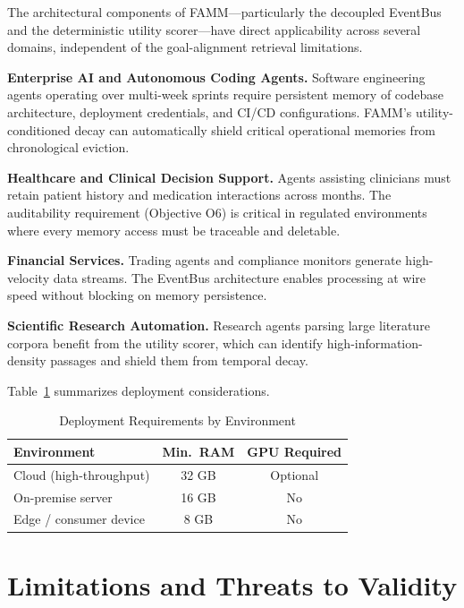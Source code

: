 \documentclass[conference]{IEEEtran}
\begin{document}
The architectural components of FAMM---particularly the decoupled EventBus and the deterministic utility scorer---have direct applicability across several domains, independent of the goal-alignment retrieval limitations.

\textbf{Enterprise AI and Autonomous Coding Agents.} Software engineering agents operating over multi-week sprints require persistent memory of codebase architecture, deployment credentials, and CI/CD configurations. FAMM's utility-conditioned decay can automatically shield critical operational memories from chronological eviction.

\textbf{Healthcare and Clinical Decision Support.} Agents assisting clinicians must retain patient history and medication interactions across months. The auditability requirement (Objective O6) is critical in regulated environments where every memory access must be traceable and deletable.

\textbf{Financial Services.} Trading agents and compliance monitors generate high-velocity data streams. The EventBus architecture enables processing at wire speed without blocking on memory persistence.

\textbf{Scientific Research Automation.} Research agents parsing large literature corpora benefit from the utility scorer, which can identify high-information-density passages and shield them from temporal decay.

Table~\ref{tab:deployment} summarizes deployment considerations.

\begin{table}[htbp]
\caption{Deployment Requirements by Environment}
\label{tab:deployment}
\begin{center}
\small
\begin{tabular}{lcc}
\toprule
\textbf{Environment} & \textbf{Min.\ RAM} & \textbf{GPU Required} \\
\midrule
Cloud (high-throughput) & 32 GB & Optional \\
On-premise server & 16 GB & No \\
Edge / consumer device & 8 GB & No \\
\bottomrule
\end{tabular}
\end{center}
\end{table}

\section{Limitations and Threats to Validity}
\label{sec:limitations}
\end{document}
